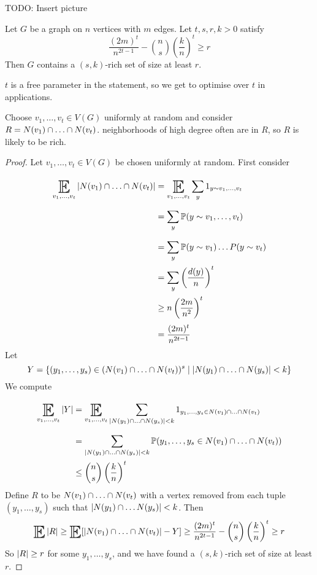 \documentclass{article}
\begin{document}
TODO: Insert picture

\begin{thm}
  Let $G$ be a graph on $n$ vertices with $m$ edges. Let $t, s, r, k > 0$ satisfy
  $$\frac{(2m)^t}{n^{2t - 1}} - \binom ns \left(\frac kn\right)^t \ge r$$
  Then $G$ contains a $(s, k)$-rich set of size at least $r$.
\end{thm}
\begin{rmk}
  $t$ is a free parameter in the statement, so we get to optimise over $t$ in applications.
\end{rmk}
\begin{idea}
  Choose $v_1, \dots, v_t \in V(G)$ uniformly at random and consider $R = N(v_1) \inter \dots \inter N(v_t)$. neighborhoods of high degree often are in $R$, so $R$ is likely to be rich.
\end{idea}
\begin{proof}
  Let $v_1, \dots, v_t \in V(G)$ be chosen uniformly at random. First consider
  \begin{align*}
    \E_{v_1, \dots, v_t} \abs{N(v_1) \inter \dots \inter N(v_t)}
    & = \E_{v_1, \dots, v_t} \sum_y 1_{y \sim v_1, \dots, v_t} \\
    & = \sum_y \P(y \sim v_1, \dots, v_t) \\
    & = \sum_y \P(y \sim v_1) \dots P(y \sim v_t) \\
    & = \sum_y \left(\frac{d(y)}n\right)^t \\
    & \ge n \left(\frac{2m}{n^2}\right)^t \\
    & = \frac{(2m)^t}{n^{2t - 1}}
  \end{align*}
  Let
  $$Y = \{(y_1, \dots, y_s) \in (N(v_1) \inter \dots \inter N(v_t))^s \mid \abs{N(y_1) \inter \dots \inter N(y_s)} < k\}$$
  We compute
  \begin{align*}
    \E_{v_1, \dots, v_t} \abs Y
    & = \E_{v_1, \dots, v_t} \sum_{\abs{N(y_1) \inter \dots \inter N(y_s)} < k} 1_{y_1, \dots, y_s \in N(v_1) \inter \dots \inter N(v_t)} \\
    & = \sum_{\abs{N(y_1) \inter \dots \inter N(y_s)} < k} \P(y_1, \dots, y_s \in N(v_1) \inter \dots \inter N(v_t)) \\
    & \le \binom ns \left(\frac kn\right)^t
  \end{align*}
  Define $R$ to be $N(v_1) \inter \dots \inter N(v_t)$ with a vertex removed from each tuple $(y_1, \dots, y_s)$ such that $\left\lvert N(y_1) \cap \dots N(y_s)\right\rvert < k$. Then
  $$\E \abs R \ge \E[\abs{N(v_1) \inter \dots \inter N(v_t)} - Y] \ge \frac{(2m)^t}{n^{2t - 1}} - \binom ns \left(\frac kn\right)^t \ge r$$
  So $\left\lvert R\right\rvert \ge r$ for some $y_1, \dots, y_s$, and we have found a $(s, k)$-rich set of size at least $r$.
\end{proof}
\end{document}
